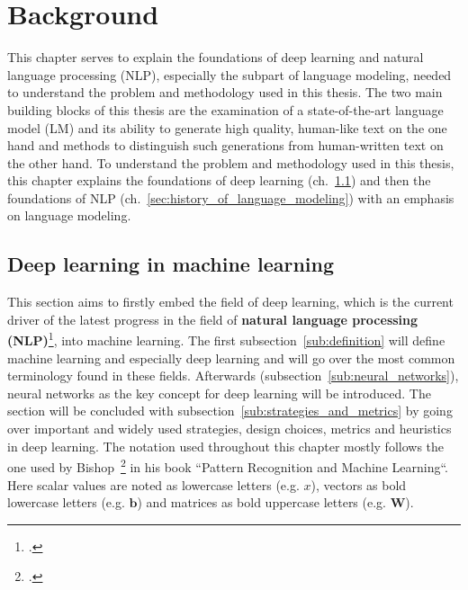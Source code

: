 \section{Background}
\label{ch:background}

This chapter serves to explain the foundations of deep learning and natural language processing (NLP), especially the subpart of language modeling, needed to understand the problem and methodology used in this thesis. The two main building blocks of this thesis are the examination of a state-of-the-art language model (LM) and its ability to generate high quality, human-like text on the one hand and methods to distinguish such generations from human-written text on the other hand. To understand the problem and methodology used in this thesis, this chapter explains the foundations of deep learning (ch.~\ref{sec:deep_learning_in_machine_learning}) and then the foundations of NLP (ch.~\ref{sec:history_of_language_modeling}) with an emphasis on language modeling.

\subsection{Deep learning in machine learning}
\label{sec:deep_learning_in_machine_learning}

This section aims to firstly embed the field of deep learning, which is the current driver of the latest progress in the field of \textbf{natural language processing (NLP)}\footcite{Deng2018}, into machine learning. The first subsection~\ref{sub:definition} will define machine learning and especially deep learning and will go over the most common terminology found in these fields. Afterwards (subsection~\ref{sub:neural_networks}), neural networks as the key concept for deep learning will be introduced. The section will be concluded with subsection~\ref{sub:strategies_and_metrics} by going over important and widely used strategies, design choices, metrics and heuristics in deep learning. The notation used throughout this chapter mostly follows the one used by Bishop~\footcite{bishop2006pattern} in his book “Pattern Recognition and Machine Learning“. Here scalar values are noted as lowercase letters (e.g. $ x $), vectors as bold lowercase letters (e.g. $ \pmb{b} $) and matrices as bold uppercase letters (e.g. $ \pmb{W} $).







